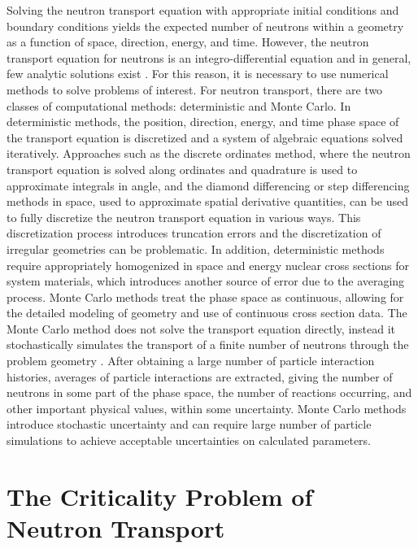 Solving the neutron transport equation with appropriate initial conditions and boundary conditions yields the expected number of neutrons within a geometry as a function of space, direction, energy, and time. However, the neutron transport equation for neutrons is an integro-differential equation and in general, few analytic solutions exist \cite{lewis_computational_1984}. For this reason, it is necessary to use numerical methods to solve problems of interest. For neutron transport, there are two classes of computational methods: deterministic and Monte Carlo. In deterministic methods, the position, direction, energy, and time phase space of the transport equation is discretized and a system of algebraic equations solved iteratively. Approaches such as the discrete ordinates method, where the neutron transport equation is solved along ordinates and quadrature is used to approximate integrals in angle, and the diamond differencing or step differencing methods in space, used to approximate spatial derivative quantities, can be used to fully discretize the neutron transport equation in various ways. This discretization process introduces truncation errors and the discretization of irregular geometries can be problematic. In addition, deterministic methods require appropriately homogenized in space and energy nuclear cross sections for system materials, which introduces another source of error due to the averaging process. Monte Carlo methods treat the phase space as continuous, allowing for the detailed modeling of geometry and use of continuous cross section data. The Monte Carlo method does not solve the transport equation directly, instead it stochastically simulates the transport of a finite number of neutrons through the problem geometry \cite{lux_monte_1991}. After obtaining a large number of particle interaction histories, averages of particle interactions are extracted, giving the number of neutrons in some part of the phase space, the number of reactions occurring, and other important physical values, within some uncertainty. Monte Carlo methods introduce stochastic uncertainty and can require large number of particle simulations to achieve acceptable uncertainties on calculated parameters.

\section{The Criticality Problem of Neutron Transport}

